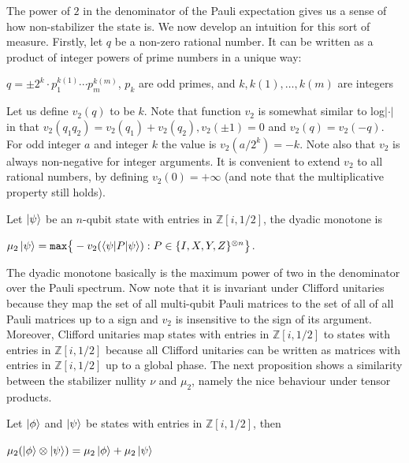 \documentclass[12pt]{dalthesis}
\begin{document}
The power of $2$ in the denominator of the Pauli expectation gives us a sense of how non-stabilizer the state is. We now develop an intuition for this sort of measure. Firstly, let $q$ be a non-zero rational number. It can be written as a product of integer powers of prime numbers in a unique way:
\begin{center}
$q = \pm 2^k \cdot p_1^{k(1)} \cdots p_m^{k(m)}$, $p_k$ are odd primes, and $k, k(1), \dots , k(m)$ are integers
\end{center}

Let us define $v_2 (q)$ to be $k$. Note that function $v_2$ is somewhat similar to log$|\cdot|$ in that $v_2(q_1q_2) = v_2(q_1) + v_2(q_2), v_2(\pm 1) = 0$ and $v_2 (q) = v_2 (-q)$. For odd integer $a$ and integer $k$ the value is $v_2 (a/2^k) = - k$. Note also that $v_2$ is always non-negative for integer arguments. It is convenient to extend $v_2$ to all rational numbers, by defining $v_2(0) = + \infty $ (and note that the multiplicative property still holds).
\begin{definition}
Let $\ket{\psi}$ be an $n$-qubit state with entries in $\mathbb{Z}[i, 1/2]$, the dyadic monotone is 
\begin{center}
$\mu_2 \ket{\psi} = \texttt{max} \big\{-v_2(\braket{\psi | P | \psi}): P \in \{I, X, Y, Z \}^{\otimes n} \big\}$.
\end{center}
\end{definition}
The dyadic monotone basically is the maximum power of two in the denominator over the Pauli spectrum. Now note that it is invariant under Clifford unitaries because they map the set of all multi-qubit Pauli matrices to the set of all of all Pauli matrices up to a sign and $v_2$ is insensitive to the sign of its argument. Moreover, Clifford unitaries map states with entries in $\mathbb{Z}[i, 1/2]$ to states with entries in $\mathbb{Z}[i, 1/2]$ because all Clifford unitaries can be written as matrices with entries in $\mathbb{Z}[i, 1/2]$ up to a global phase. The next proposition shows a similarity between the stabilizer nullity $\nu$ and $\mu_2$, namely the nice behaviour under tensor products.

\begin{proposition}
Let $\ket{\phi}$ and $\ket{\psi}$ be states with entries in $\mathbb{Z}[i, 1/2]$, then 
\begin{center}
$\mu_2 (\ket{\phi} \otimes \ket{\psi}) = \mu_2 \ket{\phi} + \mu_2 \ket{\psi}$
\end{center}
\end{proposition}
\end{document}
